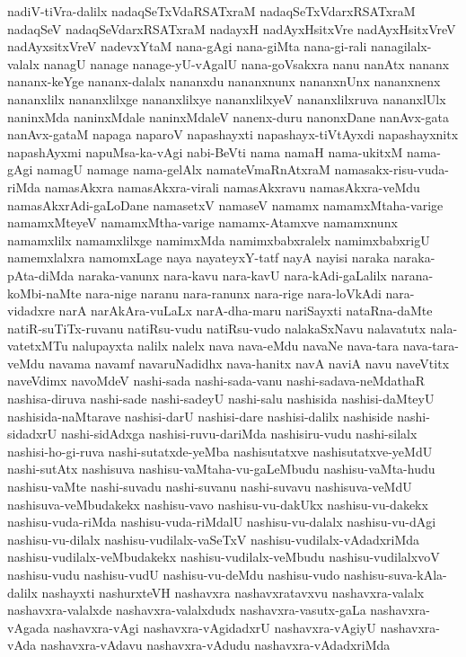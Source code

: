 {nadiV-tiVra-dalilx
nadaqSeTxVdaRSATxraM
nadaqSeTxVdarxRSATxraM
nadaqSeV
nadaqSeVdarxRSATxraM
nadayxH
nadAyxHsitxVre
nadAyxHsitxVreV
nadAyxsitxVreV
nadevxYtaM
nana-gAgi
nana-giMta
nana-gi-rali
nanagilalx-valalx
nanagU
nanage
nanage-yU-vAgalU
nana-goVsakxra
nanu
nanAtx
nananx
nananx-keYge
nananx-dalalx
nananxdu
nananxnunx
nananxnUnx
nananxnenx
nananxlilx
nananxlilxge
nananxlilxye
nananxlilxyeV
nananxlilxruva
nananxlUlx
naninxMda
naninxMdale
naninxMdaleV
nanenx-duru
nanonxDane
nanAvx-gata
nanAvx-gataM
napaga
naparoV
napashayxti
napashayx-tiVtAyxdi
napashayxnitx
napashAyxmi
napuMsa-ka-vAgi
nabi-BeVti
nama
namaH
nama-ukitxM
nama-gAgi
namagU
namage
nama-gelAlx
namateVmaRnAtxraM
namasakx-risu-vuda-riMda
namasAkxra
namasAkxra-virali
namasAkxravu
namasAkxra-veMdu
namasAkxrAdi-gaLoDane
namasetxV
namaseV
namamx
namamxMtaha-varige
namamxMteyeV
namamxMtha-varige
namamx-Atamxve
namamxnunx
namamxlilx
namamxlilxge
namimxMda
namimxbabxralelx
namimxbabxrigU
namemxlalxra
namomxLage
naya
nayateyxY-tatf
nayA
nayisi
naraka
naraka-pAta-diMda
naraka-vanunx
nara-kavu
nara-kavU
nara-kAdi-gaLalilx
narana-koMbi-naMte
nara-nige
naranu
nara-ranunx
nara-rige
nara-loVkAdi
nara-vidadxre
narA
narAkAra-vuLaLx
narA-dha-maru
nariSayxti
nataRna-daMte
natiR-suTiTx-ruvanu
natiRsu-vudu
natiRsu-vudo
nalakaSxNavu
nalavatutx
nala-vatetxMTu
nalupayxta
nalilx
nalelx
nava
nava-eMdu
navaNe
nava-tara
nava-tara-veMdu
navama
navamf
navaruNadidhx
nava-hanitx
navA
naviA
navu
naveVtitx
naveVdimx
navoMdeV
nashi-sada
nashi-sada-vanu
nashi-sadava-neMdathaR
nashisa-diruva
nashi-sade
nashi-sadeyU
nashi-salu
nashisida
nashisi-daMteyU
nashisida-naMtarave
nashisi-darU
nashisi-dare
nashisi-dalilx
nashiside
nashi-sidadxrU
nashi-sidAdxga
nashisi-ruvu-dariMda
nashisiru-vudu
nashi-silalx
nashisi-ho-gi-ruva
nashi-sutatxde-yeMba
nashisutatxve
nashisutatxve-yeMdU
nashi-sutAtx
nashisuva
nashisu-vaMtaha-vu-gaLeMbudu
nashisu-vaMta-hudu
nashisu-vaMte
nashi-suvadu
nashi-suvanu
nashi-suvavu
nashisuva-veMdU
nashisuva-veMbudakekx
nashisu-vavo
nashisu-vu-dakUkx
nashisu-vu-dakekx
nashisu-vuda-riMda
nashisu-vuda-riMdalU
nashisu-vu-dalalx
nashisu-vu-dAgi
nashisu-vu-dilalx
nashisu-vudilalx-vaSeTxV
nashisu-vudilalx-vAdadxriMda
nashisu-vudilalx-veMbudakekx
nashisu-vudilalx-veMbudu
nashisu-vudilalxvoV
nashisu-vudu
nashisu-vudU
nashisu-vu-deMdu
nashisu-vudo
nashisu-suva-kAla-dalilx
nashayxti
nashurxteVH
nashavxra
nashavxratavxvu
nashavxra-valalx
nashavxra-valalxde
nashavxra-valalxdudx
nashavxra-vasutx-gaLa
nashavxra-vAgada
nashavxra-vAgi
nashavxra-vAgidadxrU
nashavxra-vAgiyU
nashavxra-vAda
nashavxra-vAdavu
nashavxra-vAdudu
nashavxra-vAdadxriMda
}
